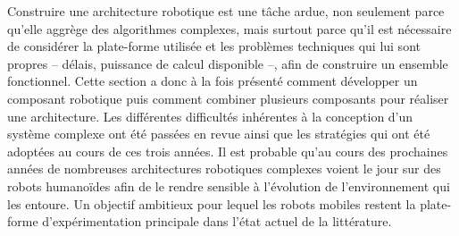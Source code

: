 Construire une architecture robotique est une tâche ardue, non
seulement parce qu'elle aggrège des algorithmes complexes, mais
surtout parce qu'il est nécessaire de considérer la plate-forme
utilisée et les problèmes techniques qui lui sont propres -- délais,
puissance de calcul disponible --, afin de construire un ensemble
fonctionnel. Cette section a donc à la fois présenté comment
développer un composant robotique puis comment combiner plusieurs
composants pour réaliser une architecture. Les différentes difficultés
inhérentes à la conception d'un système complexe ont été passées en
revue ainsi que les stratégies qui ont été adoptées au cours de ces
trois années. Il est probable qu'au cours des prochaines années de
nombreuses architectures robotiques complexes voient le jour sur des
robots humanoïdes afin de le rendre sensible à l'évolution de
l'environnement qui les entoure. Un objectif ambitieux pour lequel les
robots mobiles restent la plate-forme d'expérimentation principale
dans l'état actuel de la littérature.



